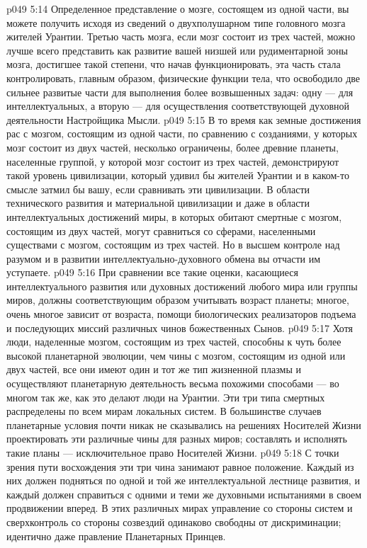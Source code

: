 \vs p049 5:14 Определенное представление о мозге, состоящем из одной части, вы можете получить исходя из сведений о двухполушарном типе головного мозга жителей Урантии. Третью часть мозга, если мозг состоит из трех частей, можно лучше всего представить как развитие вашей низшей или рудиментарной зоны мозга, достигшее такой степени, что начав функционировать, эта часть стала контролировать, главным образом, физические функции тела, что освободило две сильнее развитые части для выполнения более возвышенных задач: одну --- для интеллектуальных, а вторую --- для осуществления соответствующей духовной деятельности Настройщика Мысли.
\vs p049 5:15 В то время как земные достижения рас с мозгом, состоящим из одной части, по сравнению с созданиями, у которых мозг состоит из двух частей, несколько ограничены, более древние планеты, населенные группой, у которой мозг состоит из трех частей, демонстрируют такой уровень цивилизации, который удивил бы жителей Урантии и в каком\hyp{}то смысле затмил бы вашу, если сравнивать эти цивилизации. В области технического развития и материальной цивилизации и даже в области интеллектуальных достижений миры, в которых обитают смертные с мозгом, состоящим из двух частей, могут сравниться со сферами, населенными существами с мозгом, состоящим из трех частей. Но в высшем контроле над разумом и в развитии интеллектуально\hyp{}духовного обмена вы отчасти им уступаете.
\vs p049 5:16 При сравнении все такие оценки, касающиеся интеллектуального развития или духовных достижений любого мира или группы миров, должны соответствующим образом учитывать возраст планеты; многое, очень многое зависит от возраста, помощи биологических реализаторов подъема и последующих миссий различных чинов божественных Сынов.
\vs p049 5:17 Хотя люди, наделенные мозгом, состоящим из трех частей, способны к чуть более высокой планетарной эволюции, чем чины с мозгом, состоящим из одной или двух частей, все они имеют один и тот же тип жизненной плазмы и осуществляют планетарную деятельность весьма похожими способами --- во многом так же, как это делают люди на Урантии. Эти три типа смертных распределены по всем мирам локальных систем. В большинстве случаев планетарные условия почти никак не сказывались на решениях Носителей Жизни проектировать эти различные чины для разных миров; составлять и исполнять такие планы --- исключительное право Носителей Жизни.
\vs p049 5:18 С точки зрения пути восхождения эти три чина занимают равное положение. Каждый из них должен подняться по одной и той же интеллектуальной лестнице развития, и каждый должен справиться с одними и теми же духовными испытаниями в своем продвижении вперед. В этих различных мирах управление со стороны систем и сверхконтроль со стороны созвездий одинаково свободны от дискриминации; идентично даже правление Планетарных Принцев.
